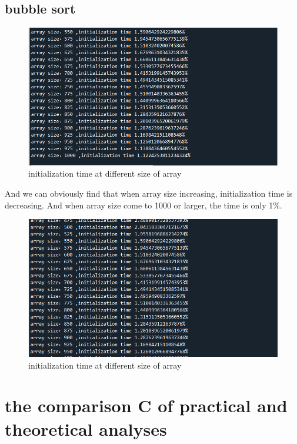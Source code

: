 \documentclass{article}
\begin{document}
\subsection{bubble sort}
\begin{figure}[H]
    \centering
    \includegraphics[scale=0.5]{bubbletime1.png}
    \caption{initialization time at different size of array}
\end{figure}
And we can obviously find that when array size increasing, initialization time is decreasing. And when array size come to 1000 or larger, the time is only 1\%.
\begin{figure}[H]
    \centering
    \includegraphics[scale=0.5]{bubbletime2.png}
    \caption{initialization time at different size of array}
\end{figure}
\section{the comparison C of practical and theoretical analyses}
\end{document}
